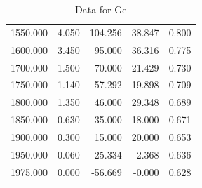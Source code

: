 \documentclass[english,11pt,a4paper]{article}
\begin{document}
\begin{multicols}{2}
\begin{table}[H]
\begin{tabular}{rr|rrr}
				1550.000 & 4.050 & 104.256 & 38.847 & 0.800 \\
				1600.000 & 3.450 & 95.000 & 36.316 & 0.775 \\
				1700.000 & 1.500 & 70.000 & 21.429 & 0.730 \\
				1750.000 & 1.140 & 57.292 & 19.898 & 0.709 \\
				1800.000 & 1.350 & 46.000 & 29.348 & 0.689 \\
				1850.000 & 0.630 & 35.000 & 18.000 & 0.671 \\
				1900.000 & 0.300 & 15.000 & 20.000 & 0.653 \\
				1950.000 & 0.060 & -25.334 & -2.368 & 0.636 \\
				1975.000 & 0.000 & -56.669 & -0.000 & 0.628 \\
				
			\end{tabular}
			\caption{Data for Ge}
		\end{table}
		

\end{multicols}
\end{document}
